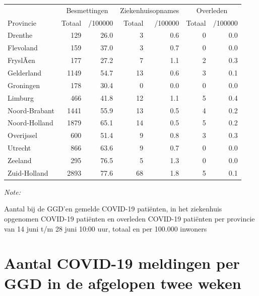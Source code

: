\documentclass[
  english,
  man,floatsintext]{apa6}
\begin{document}
\begin{table}
\centering
\begin{threeparttable}
\begin{tabular}{lrrrrrr}
\toprule
\multicolumn{1}{c}{ } & \multicolumn{2}{c}{Besmettingen} & \multicolumn{2}{c}{Ziekenhuisopnames} & \multicolumn{2}{c}{Overleden} \\
\cmidrule(l{3pt}r{3pt}){2-3} \cmidrule(l{3pt}r{3pt}){4-5} \cmidrule(l{3pt}r{3pt}){6-7}
Provincie & Totaal & /100000 & Totaal & /100000 & Totaal & /100000\\
\midrule
Drenthe & 129 & 26.0 & 3 & 0.6 & 0 & 0.0\\
Flevoland & 159 & 37.0 & 3 & 0.7 & 0 & 0.0\\
FryslÃ¢n & 177 & 27.2 & 7 & 1.1 & 2 & 0.3\\
Gelderland & 1149 & 54.7 & 13 & 0.6 & 3 & 0.1\\
Groningen & 178 & 30.4 & 0 & 0.0 & 0 & 0.0\\
Limburg & 466 & 41.8 & 12 & 1.1 & 5 & 0.4\\
Noord-Brabant & 1441 & 55.9 & 13 & 0.5 & 4 & 0.2\\
Noord-Holland & 1879 & 65.1 & 14 & 0.5 & 5 & 0.2\\
Overijssel & 600 & 51.4 & 9 & 0.8 & 3 & 0.3\\
Utrecht & 866 & 63.6 & 9 & 0.7 & 0 & 0.0\\
Zeeland & 295 & 76.5 & 5 & 1.3 & 0 & 0.0\\
Zuid-Holland & 2893 & 77.6 & 68 & 1.8 & 5 & 0.1\\
\bottomrule
\end{tabular}
\begin{tablenotes}
\item \textit{Note: } 
\item Aantal bij de GGD’en gemelde COVID-19 patiënten, in het ziekenhuis opgenomen COVID-19 patiënten en overleden COVID-19 patiënten per provincie van 14 juni t/m 28 juni 10:00 uur, totaal en per 100.000 inwoners
\end{tablenotes}
\end{threeparttable}
\end{table}

\newpage

\hypertarget{aantal-covid-19-meldingen-per-ggd-in-de-afgelopen-twee-weken}{%
\section{Aantal COVID-19 meldingen per GGD in de afgelopen twee weken}\label{aantal-covid-19-meldingen-per-ggd-in-de-afgelopen-twee-weken}}
\end{document}
